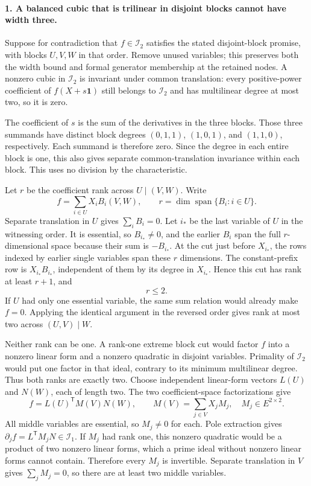 \paragraph{1. A balanced cubic that is trilinear in disjoint blocks cannot have width three.}
Suppose for contradiction that $f\in\mathcal I_2$ satisfies
the stated disjoint-block promise, with blocks $U,V,W$ in
that order. Remove unused variables; this preserves both the
width bound and formal generator membership at the retained
nodes. A nonzero cubic in $\mathcal I_2$ is invariant under
common translation: every positive-power coefficient of
$f(X+s\mathbf1)$ still belongs to $\mathcal I_2$ and has
multilinear degree at most two, so it is zero.

The coefficient of $s$ is the sum of the derivatives in the
three blocks. Those three summands have distinct block degrees
$(0,1,1)$, $(1,0,1)$, and $(1,1,0)$, respectively. Each
summand is therefore zero. Since the degree in each entire
block is one, this also gives separate common-translation
invariance within each block. This uses no division by the
characteristic.

Let $r$ be the coefficient rank across $U\mid(V,W)$. Write
\[
 f=\sum_{i\in U}X_i B_i(V,W),\qquad
 r=\dim\operatorname{span}\{B_i:i\in U\}.
 \tag{P18.3}
\]
Separate translation in $U$ gives $\sum_i B_i=0$. Let $i_*$
be the last variable of $U$ in the witnessing order. It is
essential, so $B_{i_*}\ne0$, and the earlier $B_i$ span the
full $r$-dimensional space because their sum is $-B_{i_*}$.
At the cut just before $X_{i_*}$, the rows indexed by earlier
single variables span these $r$ dimensions. The constant-prefix
row is $X_{i_*}B_{i_*}$, independent of them by its degree in
$X_{i_*}$. Hence this cut has rank at least $r+1$, and
\[
 r\le2.
 \tag{P18.4}
\]
If $U$ had only one essential variable, the same sum relation
would already make $f=0$. Applying the identical argument in
the reversed order gives rank at most two across
$(U,V)\mid W$.

Neither rank can be one. A rank-one extreme block cut would
factor $f$ into a nonzero linear form and a nonzero quadratic
in disjoint variables. Primality of $\mathcal I_2$ would put
one factor in that ideal, contrary to its minimum multilinear
degree. Thus both ranks are exactly two. Choose independent
linear-form vectors $L(U)$ and $N(W)$, each of length two.
The two coefficient-space factorizations give
\[
 f=L(U)^{\mathsf T}M(V)N(W),\qquad
 M(V)=\sum_{j\in V}X_j M_j,\quad M_j\in E^{2\times2}.
 \tag{P18.5}
\]
All middle variables are essential, so $M_j\ne0$ for each.
Pole extraction gives
$\partial_j f=L^{\mathsf T}M_jN\in\mathcal I_1$.
If $M_j$ had rank one, this nonzero quadratic would be a
product of two nonzero linear forms, which a prime ideal
without nonzero linear forms cannot contain. Therefore every
$M_j$ is invertible. Separate translation in $V$ gives
$\sum_jM_j=0$, so there are at least two middle variables.

